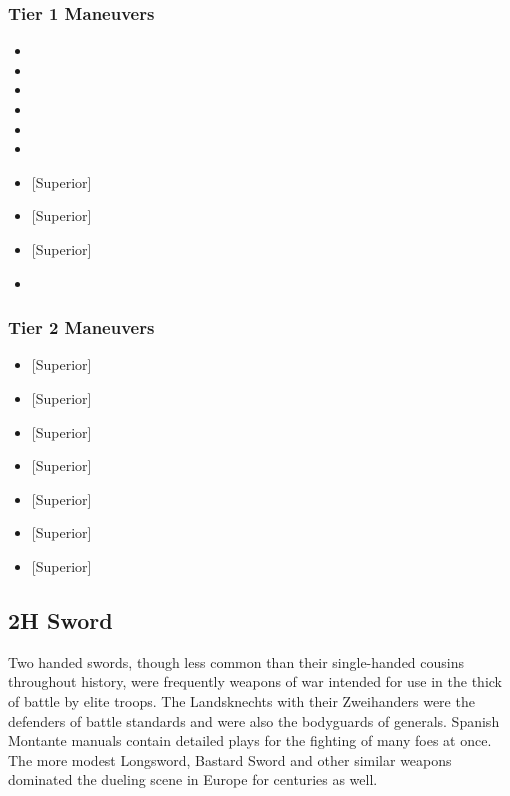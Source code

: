 \documentclass[oneside,11pt,english]{book}
\begin{document}
\subsubsection{Tier 1 Maneuvers}
\vspace{-5pt}\begin{itemize}
  [itemsep=0.5mm]
\item {}
\item {}
\item {}
\item {}
\item {}
\item {}
\item {} [Superior]
\item {} [Superior]
\item {} [Superior]
\item {}
\end{itemize}
\subsubsection{Tier 2 Maneuvers}
\vspace{-5pt}\begin{itemize}
  [itemsep=0.5mm]
\item {} [Superior]
\item {} [Superior]
\item {} [Superior]
\item {} [Superior]
\item {} [Superior]
\item {} [Superior]
\item {} [Superior]
\end{itemize}

\subsection{2H Sword}
Two handed swords, though less common than their single-handed cousins
throughout history, were frequently weapons of war intended for use in the thick
of battle by elite troops. The Landsknechts with their Zweihanders were the
defenders of battle standards and were also the bodyguards of generals. Spanish
Montante manuals contain detailed plays for the fighting of many foes at once.
The more modest Longsword, Bastard Sword and other similar weapons dominated the
dueling scene in Europe for centuries as well.  
\end{document}
